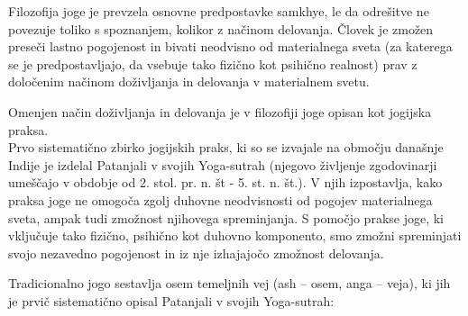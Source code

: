 \documentclass[a4paper, 12pt]{book}
\begin{document}
Filozofija joge je prevzela osnovne predpostavke samkhye, le da odrešitve ne povezuje toliko s spoznanjem, kolikor z načinom delovanja. Človek je zmožen preseči lastno pogojenost in bivati neodvisno od materialnega sveta (za katerega se je predpostavljajo, da vsebuje tako fizično kot psihično realnost) prav z določenim načinom doživljanja in delovanja v materialnem svetu.

Omenjen način doživljanja in delovanja je v filozofiji joge opisan kot jogijska praksa. \\ 
Prvo sistematično zbirko jogijskih praks, ki so se izvajale na območju današnje Indije je izdelal Patanjali v svojih Yoga-sutrah (njegovo življenje zgodovinarji umeščajo v obdobje od 2. stol. pr. n. št - 5. st. n. št.). V njih izpostavlja, kako praksa joge ne omogoča zgolj duhovne neodvisnosti od pogojev materialnega sveta, ampak tudi zmožnost njihovega spreminjanja. S pomočjo prakse joge, ki vključuje tako fizično, psihično kot duhovno komponento, smo zmožni spreminjati svojo nezavedno pogojenost in iz nje izhajajočo zmožnost delovanja.~\cite{ZgodovinaJoge}

Tradicionalno jogo sestavlja osem temeljnih vej (ash – osem, anga – veja), ki jih je prvič sistematično opisal Patanjali v svojih Yoga-sutrah:
\end{document}
